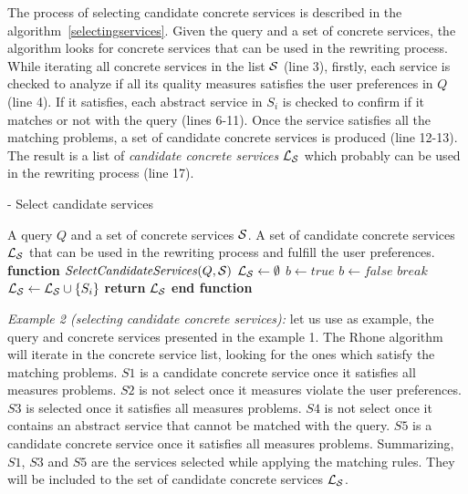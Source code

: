 The process of selecting candidate concrete services
is described in the algorithm~\ref{selectingservices}.
Given the query and a set of concrete services, the algorithm
looks for concrete services that can be used in the rewriting process.
While iterating all concrete services in the list $\hbox{${\cal S}$}$ (line 3), firstly,
each service is checked to analyze if all its quality measures satisfies the user preferences
in $Q$ (line 4). If it satisfies, each abstract service in $S_{i}$ is checked to confirm if 
it matches or not with the query (lines 6-11). Once the service satisfies all the matching 
problems, a set of candidate concrete services is produced (line 12-13). The result
is a list of \textit{candidate concrete services} $\hbox{${\cal L_{S}}$}$ which
probably can be used in the rewriting process (line 17).

\begin{algorithm}
\caption{ - Select candidate services}
\label{selectingservices}
\begin{algorithmic}[1]
\REQUIRE A query $Q$ and a set of concrete services $\hbox{${\cal S}$}$.
\ENSURE A set of candidate concrete services $\hbox{${\cal L_{S}}$}$ that can be used in the rewriting process and fulfill the user preferences.
\STATE \textbf{function} $\mathit{SelectCandidateServices} (Q, \hbox{${\cal S}$})$
\STATE $\hbox{${\cal L_{S}}$} \leftarrow \emptyset$
		\STATE $b \leftarrow \mathit{true}$		
				\STATE $b \leftarrow \mathit{false}$	
				\STATE $\mathit{break}$
			\ENDIF
		\ENDFOR
			\STATE $\hbox{${\cal L_{S}}$} \leftarrow \hbox{${\cal L_{S}}$} \cup \lbrace S_{i} \rbrace$	
		\ENDIF
	\ENDIF
\ENDFOR
\STATE \textbf{return} $\hbox{${\cal L_{S}}$}$
\STATE \textbf{end function}
\end{algorithmic}
\end{algorithm}

\bigskip
\noindent \textit{Example 2 (selecting candidate concrete services):} let us use as example, the query and concrete services presented in the example 1. The Rhone algorithm will iterate in the concrete service list,
looking for the ones which satisfy the matching problems. 
$S1$ is a candidate concrete service once it satisfies all measures problems.
$S2$ is not select once it measures violate the user preferences.
$S3$ is selected once it satisfies all measures problems.
$S4$ is not select once it contains an abstract service that cannot be matched with the query.
$S5$ is a candidate concrete service once it satisfies all measures problems. 
Summarizing, $S1$, $S3$ and $S5$ are the services selected while applying the matching rules.  
They will be included to the set of candidate concrete services $\hbox{${\cal L_{S}}$}$. 

